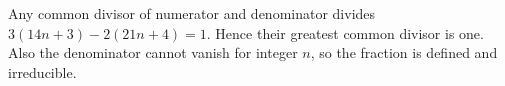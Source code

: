Any common divisor of numerator and denominator divides $3(14n+3)-2(21n+4)=1$. Hence their greatest common divisor is one. Also the denominator cannot vanish for integer $n$, so the fraction is defined and irreducible.
